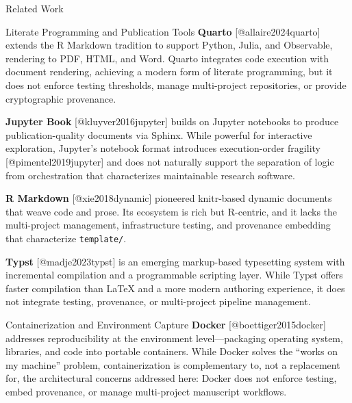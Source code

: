 \documentclass[
  ignorenonframetext,
]{beamer}
\begin{document}
\begin{frame}[fragile]{Related Work}
\begin{block}{Literate Programming and Publication Tools}
\textbf{Quarto} {[}@allaire2024quarto{]} extends the R Markdown
tradition to support Python, Julia, and Observable, rendering to PDF,
HTML, and Word. Quarto integrates code execution with document
rendering, achieving a modern form of literate programming, but it does
not enforce testing thresholds, manage multi-project repositories, or
provide cryptographic provenance.

\textbf{Jupyter Book} {[}@kluyver2016jupyter{]} builds on Jupyter
notebooks to produce publication-quality documents via Sphinx. While
powerful for interactive exploration, Jupyter's notebook format
introduces execution-order fragility {[}@pimentel2019jupyter{]} and does
not naturally support the separation of logic from orchestration that
characterizes maintainable research software.

\textbf{R Markdown} {[}@xie2018dynamic{]} pioneered knitr-based dynamic
documents that weave code and prose. Its ecosystem is rich but
R-centric, and it lacks the multi-project management, infrastructure
testing, and provenance embedding that characterize \texttt{template/}.

\textbf{Typst} {[}@madje2023typst{]} is an emerging markup-based
typesetting system with incremental compilation and a programmable
scripting layer. While Typst offers faster compilation than LaTeX and a
more modern authoring experience, it does not integrate testing,
provenance, or multi-project pipeline management.
\end{block}

\begin{block}{Containerization and Environment Capture}
\protect{}\label{containerization-and-environment-capture}
\textbf{Docker} {[}@boettiger2015docker{]} addresses reproducibility at
the environment level---packaging operating system, libraries, and code
into portable containers. While Docker solves the ``works on my
machine'' problem, containerization is complementary to, not a
replacement for, the architectural concerns addressed here: Docker does
not enforce testing, embed provenance, or manage multi-project
manuscript workflows.
\end{block}


\end{frame}
\end{document}
